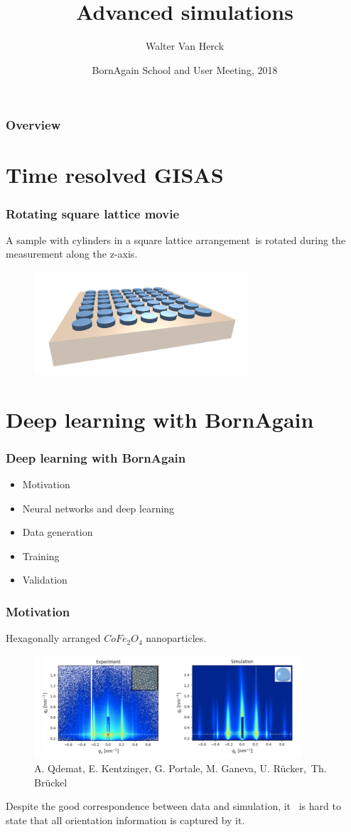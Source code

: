 \documentclass{beamer}
\title{Advanced simulations}
\author
{Walter Van Herck\inst{1}}
\institute[JCNS at MLZ] %
{
  \inst{1}%
  J\"ulich Centre for Neutron Science at MLZ
}
\date[BornAgain] %
{BornAgain School and User Meeting, 2018}
\begin{document}
\frame[plain]{\titlepage}

\begin{frame}
    \frametitle{Overview}
    \tableofcontents
\end{frame}

\section{Time resolved GISAS}

\begin{frame}
    \frametitle{Rotating square lattice movie}
        A sample with cylinders in a square lattice arrangement\
        is rotated during the measurement along the z-axis.
    \begin{figure}
        \includegraphics[width=8cm]{rotation_movie.png}
    \end{figure}
\end{frame}

\section{Deep learning with BornAgain}

\begin{frame}
    \frametitle{Deep learning with BornAgain}
    \begin{itemize}
        \item Motivation
        \item Neural networks and deep learning
        \item Data generation
        \item Training
        \item Validation
    \end{itemize}
\end{frame}

\begin{frame}
    \frametitle{Motivation}
    Hexagonally arranged $CoFe_2O_4$ nanoparticles.
    \begin{figure}
        \includegraphics[width=10cm]{asma_ganeva.png}
        \\ \tiny{A. Qdemat, E. Kentzinger, G. Portale, M. Ganeva, U. Rücker,\
         Th. Brückel}
    \end{figure}
    Despite the good correspondence between data and simulation, it \
    is hard to state that all orientation information is captured by it.
\end{frame}
\end{document}
